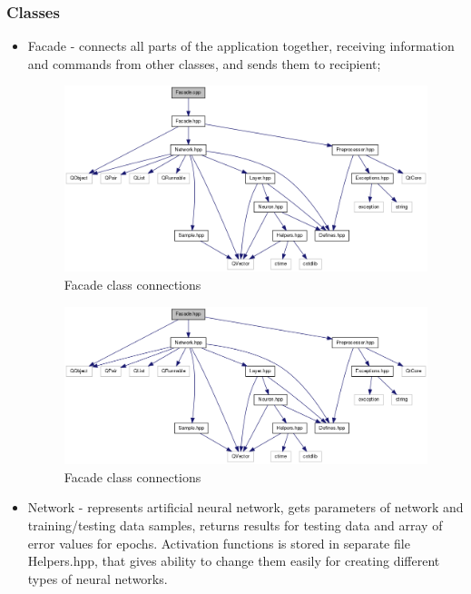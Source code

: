 \documentclass[a4paper,12pt]{article}
\begin{document}
\subsubsection{Classes}
\begin{itemize}
 \item Facade - connects all parts of the application together, receiving information and commands from other classes, and sends them to recipient;
 \begin{figure}[!ht]
 \centering
 \includegraphics[scale=0.4]{images/facadecppincl.png}
 \caption{Facade class connections}
\end{figure}

 \begin{figure}[!ht]
 \centering
 \includegraphics[scale=0.4]{images/facadehppincl.png}
 \caption{Facade class connections}
\end{figure}

\item Network - represents artificial neural network, gets parameters of network and training/testing data samples, returns results for testing data and array of error values for epochs.
Activation functions is stored in separate file Helpers.hpp, that gives ability to change them easily for creating different types of neural networks.


\end{itemize}
\end{document}
